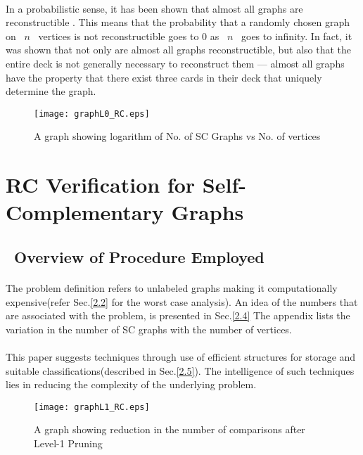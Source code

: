 \documentclass[12pt,conference]{IEEEtran}
\begin{document}
\paragraph*{} In a probabilistic sense, it has been shown that almost all graphs are reconstructible \cite{b2}. This means that the probability that a randomly chosen graph on  $n$  vertices is not reconstructible goes to $0$ as  $n$  goes to infinity. In fact, it was shown that not only are almost all graphs reconstructible, but also that the entire deck is not generally necessary to reconstruct them — almost all graphs have the property that there exist three cards in their deck that uniquely determine the graph. 


\begin{figure*}
	  \centering 
           \texttt{[image: graphL0\_RC.eps]}
	   \caption{A graph showing logarithm of No. of SC Graphs vs No. of vertices}
	   \label{plot}
  \end{figure*} 



\section{ RC Verification for Self-Complementary Graphs}



\subsection{\label{2.1} Overview of Procedure Employed }
\paragraph*{} The problem definition refers to unlabeled graphs making it computationally expensive(refer Sec.\ref{2.2} for the worst case analysis). An idea of the numbers that are associated with the problem, is presented in Sec.\ref{2.4} The appendix lists the variation in the number of SC graphs with the number of vertices. 
\paragraph*{} This paper suggests techniques through use of efficient structures for storage and suitable classifications(described in Sec.\ref{2.5}). The intelligence of such techniques lies in reducing the complexity of the underlying problem.

\begin{figure*}
	  \centering 
           \texttt{[image: graphL1\_RC.eps]}
	   \caption{A graph showing reduction in the number of comparisons after Level-1 Pruning}
	   \label{prune}
  \end{figure*} 
\end{document}
